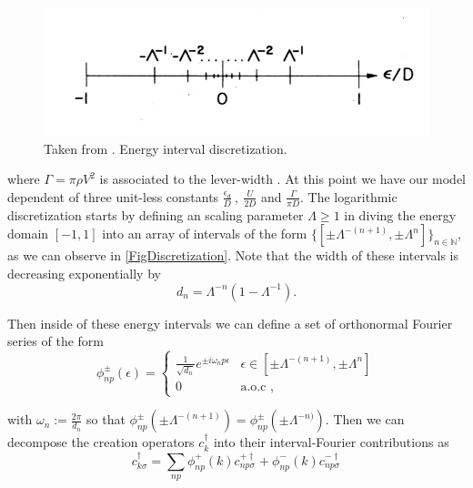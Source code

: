 \begin{figure}[h]
\centering
\includegraphics[scale=0.3]{IMAGES/Log-disc.png}\caption{\label{FigDiscretization} Taken from \citep{krishna-murthy_renormalization-group_1980}.
Energy interval discretization. \label{Energy-interval-discretization}}
\end{figure}


where $\Gamma=\pi\rho V^{2}$ is associated to the lever-width \citep[(3.5)]{sindel_numerical_2005}.
At this point we have our model dependent of three unit-less constants
$\frac{\epsilon_{d}}{D}\ ,\ \frac{U}{2D}$ and $\frac{\Gamma}{\pi D}$.
The logarithmic discretization starts by defining an scaling parameter
$\Lambda\geq1$ in diving the energy domain $[-1,1]$ into an array
of intervals of the form $\{[\pm\Lambda^{-(n+1)},\pm\Lambda^{n}]\}_{n\in\mathbb{N}}$,
as we can observe in \ref{FigDiscretization}. Note that the width
of these intervals is decreasing exponentially by 
\[
d_{n}=\Lambda^{-n}\left(1-\Lambda^{-1}\right).
\]


Then inside of these energy intervals we can define a set of orthonormal
Fourier series of the form
\begin{equation}
\phi_{np}^{\pm}(\epsilon)=\begin{cases}
\frac{1}{\sqrt{d_{n}}}e^{\pm i\omega_{n}p\epsilon} & \epsilon\in[\pm\Lambda^{-(n+1)},\pm\Lambda^{n}]\\
0 & \mbox{a.o.c },
\end{cases}\label{eq:orthonormal-Fourier}
\end{equation}


with $\omega_{n}:=\frac{2\pi}{d_{n}}$ so that $\phi_{np}^{\pm}\left(\pm\Lambda^{-(n+1)}\right)=\phi_{np}^{\pm}\left(\pm\Lambda^{-n)}\right).$
Then we can decompose the creation operators $c_{k}^{\dagger}$ into
their interval-Fourier contributions as 
\begin{equation}
c_{k\sigma}^{\dagger}=\sum_{np}\phi_{np}^{+}(k)c_{np\sigma}^{+\dagger}+\phi_{np}^{-}(k)c_{np\sigma}^{-\dagger}\label{eq:Fourier-interval decomposition}
\end{equation}


